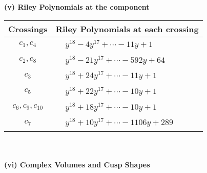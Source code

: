 \documentclass[1p]{elsarticle_modified}
\theoremstyle{definition}
\begin{document}
\newpage\renewcommand{\arraystretch}{1}
\flushleft \textbf{(v) Riley Polynomials at the component}\newline \\
\begin{tabular}{m{50pt}|m{274pt}}
Crossings & \hspace{64pt}Riley Polynomials at each crossing \\
\hline $$\begin{aligned}c_{1},c_{4}\end{aligned}$$&$\begin{aligned}
&y^{18}-4 y^{17}+\cdots-11 y+1
\end{aligned}$\\
\hline $$\begin{aligned}c_{2},c_{8}\end{aligned}$$&$\begin{aligned}
&y^{18}-21 y^{17}+\cdots-592 y+64
\end{aligned}$\\
\hline $$\begin{aligned}c_{3}\end{aligned}$$&$\begin{aligned}
&y^{18}+24 y^{17}+\cdots-11 y+1
\end{aligned}$\\
\hline $$\begin{aligned}c_{5}\end{aligned}$$&$\begin{aligned}
&y^{18}+22 y^{17}+\cdots-10 y+1
\end{aligned}$\\
\hline $$\begin{aligned}c_{6},c_{9},c_{10}\end{aligned}$$&$\begin{aligned}
&y^{18}+18 y^{17}+\cdots-10 y+1
\end{aligned}$\\
\hline $$\begin{aligned}c_{7}\end{aligned}$$&$\begin{aligned}
&y^{18}+10 y^{17}+\cdots-1106 y+289
\end{aligned}$\\
\hline
\end{tabular}\\~\\
\newpage\flushleft \textbf{(vi) Complex Volumes and Cusp Shapes}
\end{document}
